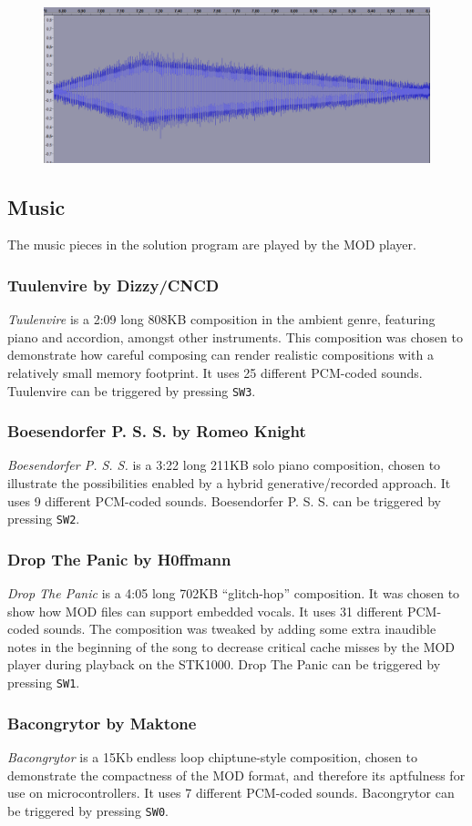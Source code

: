 \begin{figure}[H]
	\includegraphics[width = \textwidth]{images/SW4.png}
	\caption{}
	\label{img-sw4}
\end{figure}


\subsection{Music}

The music pieces in the solution program are played by the MOD player.

\subsubsection{Tuulenvire by Dizzy/CNCD}
\emph{Tuulenvire} is a 2:09 long 808KB composition in the ambient genre, featuring piano and accordion, amongst other instruments.
This composition was chosen to demonstrate how careful composing can render realistic compositions with a relatively small memory footprint.
It uses 25 different PCM-coded sounds.
Tuulenvire can be triggered by pressing \texttt{SW3}.

\subsubsection{Boesendorfer P. S. S. by Romeo Knight}
\emph{Boesendorfer P. S. S.} is a 3:22 long 211KB solo piano composition, chosen to illustrate the possibilities enabled by a hybrid generative/recorded approach.
It uses 9 different PCM-coded sounds.
Boesendorfer P. S. S. can be triggered by pressing \texttt{SW2}.

\subsubsection{Drop The Panic by H0ffmann}
\emph{Drop The Panic} is a 4:05 long 702KB ``glitch-hop'' composition.
It was chosen to show how MOD files can support embedded vocals.
It uses 31 different PCM-coded sounds.
The composition was tweaked by adding some extra inaudible notes in the beginning of the song to decrease critical cache misses by the MOD player during playback on the STK1000.
Drop The Panic can be triggered by pressing \texttt{SW1}.

\subsubsection{Bacongrytor by Maktone}
\emph{Bacongrytor} is a 15Kb endless loop chiptune-style composition, chosen to demonstrate the compactness of the MOD format, and therefore its aptfulness for use on microcontrollers.
It uses 7 different PCM-coded sounds.
Bacongrytor can be triggered by pressing \texttt{SW0}.
